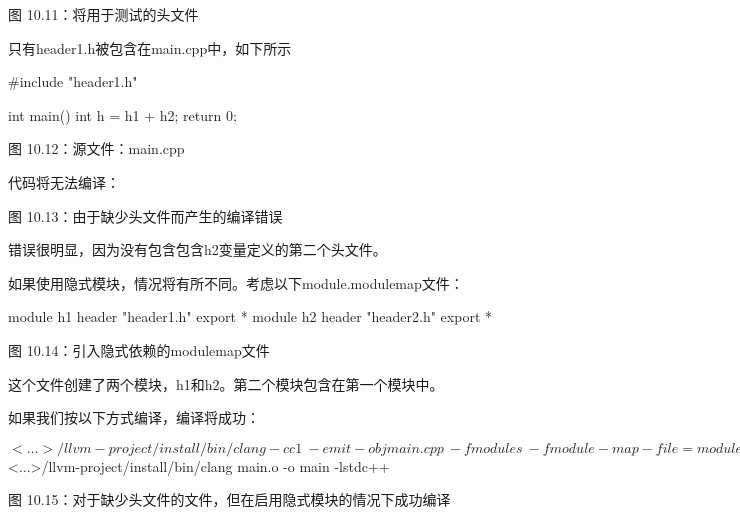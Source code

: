 \begin{center}
图 10.11：将用于测试的头文件
\end{center}

只有header1.h被包含在main.cpp中，如下所示

\begin{cpp}
#include "header1.h"

int main() {
  int h = h1 + h2;
  return 0;
}
\end{cpp}

\begin{center}
图 10.12：源文件：main.cpp
\end{center}

代码将无法编译：


\begin{center}
图 10.13：由于缺少头文件而产生的编译错误
\end{center}

错误很明显，因为没有包含包含h2变量定义的第二个头文件。

如果使用隐式模块，情况将有所不同。考虑以下module.modulemap文件：

\begin{cpp}
module h1 {
  header "header1.h"
  export *
  module h2 {
    header "header2.h"
    export *
  }
}
\end{cpp}

\begin{center}
图 10.14：引入隐式依赖的modulemap文件
\end{center}

这个文件创建了两个模块，h1和h2。第二个模块包含在第一个模块中。

如果我们按以下方式编译，编译将成功：

\begin{shell}
$ <...>/llvm-project/install/bin/clang -cc1 \
        -emit-obj main.cpp                \
        -fmodules                         \
        -fmodule-map-file=module.modulemap\
        -fmodules-cache-path=./cache      \
        -o main.o
$ <...>/llvm-project/install/bin/clang main.o -o main -lstdc++
\end{shell}

\begin{center}
图 10.15：对于缺少头文件的文件，但在启用隐式模块的情况下成功编译
\end{center}


